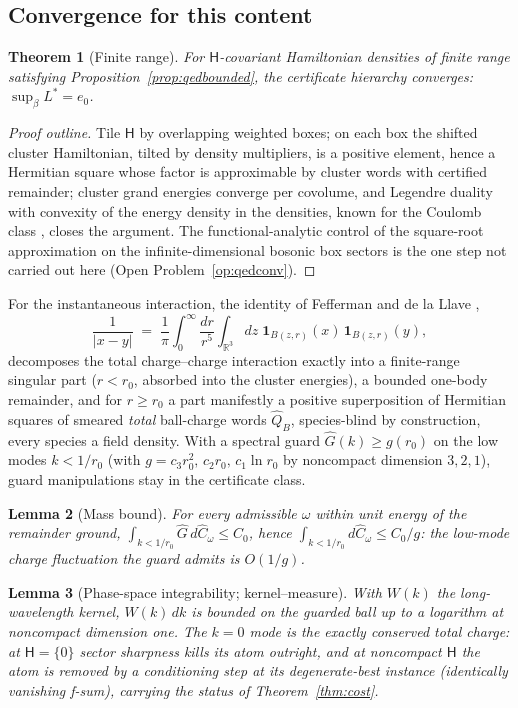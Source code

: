 \documentclass[11pt]{article}
\newtheorem{theorem}{Theorem}[section]
\newtheorem{lemma}[theorem]{Lemma}
\theoremstyle{definition}
\theoremstyle{remark}
\begin{document}
\subsection{Convergence for this content}
\begin{theorem}[Finite range]\label{thm:finiterange}
For $\mathsf H$-covariant Hamiltonian densities of finite range
satisfying Proposition~\ref{prop:qedbounded}, the certificate hierarchy
converges: $\sup_\beta L^* = e_0$.
\end{theorem}
\begin{proof}[Proof outline]
Tile $\mathsf H$ by overlapping weighted boxes; on each box the shifted
cluster Hamiltonian, tilted by density multipliers, is a positive
element, hence a Hermitian square whose factor is approximable by
cluster words with certified remainder; cluster grand energies converge
per covolume, and Legendre duality with convexity of the energy density
in the densities, known for the Coulomb class \cite{lieblebowitz},
closes the argument.  The functional-analytic control of the square-root
approximation on the infinite-dimensional bosonic box sectors is the one
step not carried out here (Open Problem~\ref{op:qedconv}).
\end{proof}

For the instantaneous interaction, the identity of Fefferman and
de la Llave \cite{fdll},
\[
\frac{1}{|x-y|} \;=\; \frac1\pi \int_0^\infty \frac{dr}{r^5}
\int_{\mathbb R^3} dz\; \mathbf 1_{B(z,r)}(x)\,\mathbf 1_{B(z,r)}(y),
\]
decomposes the total charge--charge interaction exactly into a
finite-range singular part ($r < r_0$, absorbed into the cluster energies),
a bounded one-body remainder, and for $r \ge r_0$ a part manifestly a
positive superposition of Hermitian squares of smeared \emph{total}
ball-charge words $\hat Q_B$, species-blind by construction, every species a
field density.  With a spectral guard $\hat G(k) \ge g(r_0)$ on the low
modes $k < 1/r_0$ (with $g = c_3 r_0^2,\, c_2 r_0,\, c_1 \ln r_0$ by
noncompact dimension $3, 2, 1$), guard manipulations stay in the
certificate class.

\begin{lemma}[Mass bound]\label{lem:mass}
For every admissible $\omega$ within unit energy of the remainder ground,
$\int_{k<1/r_0}\hat G\,d\hat C_\omega \le C_0$, hence $\int_{k<1/r_0}
d\hat C_\omega \le C_0/g$: the low-mode charge fluctuation the guard admits
is $O(1/g)$.
\end{lemma}

\begin{lemma}[Phase-space integrability; kernel--measure]\label{lem:phase}
With $W(k)$ the long-wavelength kernel, $W(k)\,dk$ is bounded on the guarded
ball up to a logarithm at noncompact dimension one.  The $k=0$ mode is the
exactly conserved total charge: at $\mathsf H = \{0\}$ sector sharpness
kills its atom outright, and at noncompact $\mathsf H$ the atom is removed
by a conditioning step at its degenerate-best instance (identically
vanishing f-sum), carrying the status of Theorem~\ref{thm:cost}.
\end{lemma}
\end{document}

